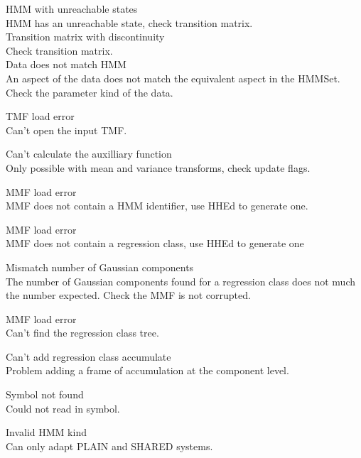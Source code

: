 \begin{itemize}
\begin{itemize}
  HMM with unreachable states\\
        HMM has an unreachable state, check transition matrix.\\

 Transition matrix with discontinuity\\
        Check transition matrix.\\        

    Data does not match HMM\\
        An aspect of the data does not match the equivalent aspect in 
        the HMMSet.  Check the parameter kind of the data.

\end{itemize}


\begin{itemize}

 TMF load error\\
        Can't open the input TMF.

 Can't calculate the auxilliary function\\
        Only possible with mean and variance transforms, check update flags.

 MMF load error\\
        MMF does not contain a HMM identifier, use HHEd to generate
        one.

 MMF load error\\
        MMF does not contain a regression class, use HHEd to generate
        one
  
 Mismatch number of Gaussian components \\
        The number of Gaussian components found for a regression class
        does not much the number expected. Check the MMF is not corrupted.

 MMF load error\\
        Can't find the regression class tree.

 Can't add regression class accumulate\\
        Problem adding a frame of accumulation at the component level.

 Symbol not found\\
        Could not read in symbol.

 Invalid HMM kind\\
        Can only adapt PLAIN and SHARED systems.


\end{itemize}
\end{itemize}
